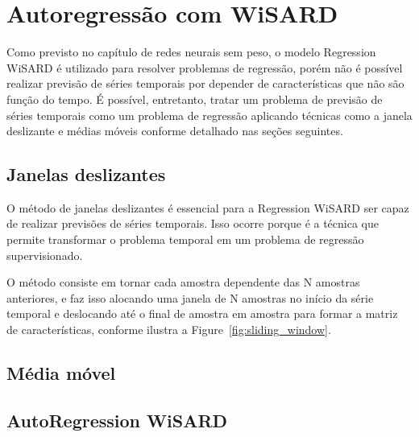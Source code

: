 \chapter{Autoregressão com WiSARD}
Como previsto no capítulo de redes neurais sem peso, o modelo Regression WiSARD é utilizado para resolver problemas de regressão, porém não é possível realizar previsão de séries temporais por depender de características que não são função do tempo. É possível, entretanto, tratar um problema de previsão de séries temporais como um problema de regressão aplicando técnicas como a janela deslizante e médias móveis conforme detalhado nas seções seguintes.

\section{Janelas deslizantes}
O método de janelas deslizantes é essencial para a Regression WiSARD ser capaz de realizar previsões de séries temporais. Isso ocorre porque é a técnica que permite transformar o problema temporal em um problema de regressão supervisionado.

O método consiste em tornar cada amostra dependente das N amostras anteriores, e faz isso alocando uma janela de N amostras no início da série temporal e deslocando até o final de amostra em amostra para formar a matriz de características, conforme ilustra a Figure~\ref{fig:sliding_window}.


\section{Média móvel}



\section{AutoRegression WiSARD}


